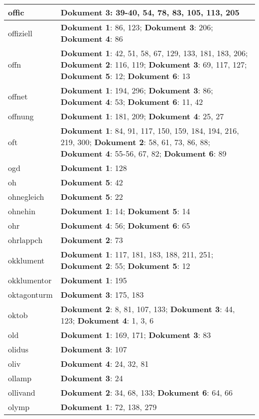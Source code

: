 \documentclass[a5paper]{article}
\begin{document}
\begin{longtable}[l]{|l|p{3in}|}
\hline
offic & \textbf{Dokument 3}: 39-40, 54, 78, 83, 105, 113, 205 \\
\hline
offiziell & \textbf{Dokument 1}: 86, 123; \textbf{Dokument 3}: 206; \textbf{Dokument 4}: 86 \\
\hline
offn & \textbf{Dokument 1}: 42, 51, 58, 67, 129, 133, 181, 183, 206; \textbf{Dokument 2}: 116, 119; \textbf{Dokument 3}: 69, 117, 127; \textbf{Dokument 5}: 12; \textbf{Dokument 6}: 13 \\
\hline
offnet & \textbf{Dokument 1}: 194, 296; \textbf{Dokument 3}: 86; \textbf{Dokument 4}: 53; \textbf{Dokument 6}: 11, 42 \\
\hline
offnung & \textbf{Dokument 1}: 181, 209; \textbf{Dokument 4}: 25, 27 \\
\hline
oft & \textbf{Dokument 1}: 84, 91, 117, 150, 159, 184, 194, 216, 219, 300; \textbf{Dokument 2}: 58, 61, 73, 86, 88; \textbf{Dokument 4}: 55-56, 67, 82; \textbf{Dokument 6}: 89 \\
\hline
ogd & \textbf{Dokument 1}: 128 \\
\hline
oh & \textbf{Dokument 5}: 42 \\
\hline
ohnegleich & \textbf{Dokument 5}: 22 \\
\hline
ohnehin & \textbf{Dokument 1}: 14; \textbf{Dokument 5}: 14 \\
\hline
ohr & \textbf{Dokument 4}: 56; \textbf{Dokument 6}: 65 \\
\hline
ohrlappch & \textbf{Dokument 2}: 73 \\
\hline
okklument & \textbf{Dokument 1}: 117, 181, 183, 188, 211, 251; \textbf{Dokument 2}: 55; \textbf{Dokument 5}: 12 \\
\hline
okklumentor & \textbf{Dokument 1}: 195 \\
\hline
oktagonturm & \textbf{Dokument 3}: 175, 183 \\
\hline
oktob & \textbf{Dokument 2}: 8, 81, 107, 133; \textbf{Dokument 3}: 44, 123; \textbf{Dokument 4}: 1, 3, 6 \\
\hline
old & \textbf{Dokument 1}: 169, 171; \textbf{Dokument 3}: 83 \\
\hline
olidus & \textbf{Dokument 3}: 107 \\
\hline
oliv & \textbf{Dokument 4}: 24, 32, 81 \\
\hline
ollamp & \textbf{Dokument 3}: 24 \\
\hline
ollivand & \textbf{Dokument 2}: 34, 68, 133; \textbf{Dokument 6}: 64, 66 \\
\hline
olymp & \textbf{Dokument 1}: 72, 138, 279 \\

\end{longtable}
\end{document}
